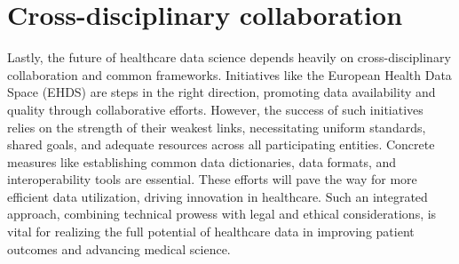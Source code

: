 \section{Cross-disciplinary collaboration}
Lastly, the future of healthcare data science depends heavily on cross-disciplinary collaboration and common frameworks. Initiatives like the European Health Data Space (EHDS) are steps in the right direction, promoting data availability and quality through collaborative efforts. However, the success of such initiatives relies on the strength of their weakest links, necessitating uniform standards, shared goals, and adequate resources across all participating entities. Concrete measures like establishing common data dictionaries, data formats, and interoperability tools are essential. These efforts will pave the way for more efficient data utilization, driving innovation in healthcare. Such an integrated approach, combining technical prowess with legal and ethical considerations, is vital for realizing the full potential of healthcare data in improving patient outcomes and advancing medical science.




